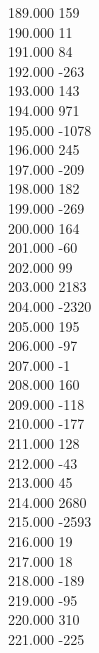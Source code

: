 { 189.000	159 \\
 190.000	11 \\
 191.000	84 \\
 192.000	-263 \\
 193.000	143 \\
 194.000	971 \\
 195.000	-1078 \\
 196.000	245 \\
 197.000	-209 \\
 198.000	182 \\
 199.000	-269 \\
 200.000	164 \\
 201.000	-60 \\
 202.000	99 \\
 203.000	2183 \\
 204.000	-2320 \\
 205.000	195 \\
 206.000	-97 \\
 207.000	-1 \\
 208.000	160 \\
 209.000	-118 \\
 210.000	-177 \\
 211.000	128 \\
 212.000	-43 \\
 213.000	45 \\
 214.000	2680 \\
 215.000	-2593 \\
 216.000	19 \\
 217.000	18 \\
 218.000	-189 \\
 219.000	-95 \\
 220.000	310 \\
 221.000	-225 \\
}
